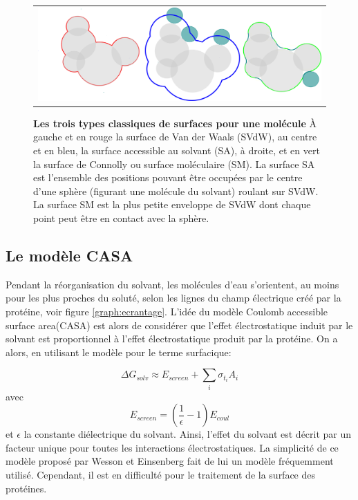    \begin{figure}[!htbp]
     \centering
     \begin{tabular}{c}
       \includegraphics[width=13cm]{figure/surface.png} &
     \end{tabular}
     
     \caption{\textbf{Les trois types classiques de surfaces pour une molécule} À gauche et en rouge la surface de Van der Waals (SVdW), au centre et en bleu, la surface accessible au solvant (SA), à droite, et en vert  la surface de Connolly ou surface moléculaire (SM). La surface SA est l'ensemble des positions pouvant être occupées par le centre d'une sphère (figurant une molécule du solvant) roulant sur SVdW. La surface SM est la plus petite enveloppe de SVdW dont chaque point peut être en contact avec la sphère. } 
\label{graph:surface}
   \end{figure}
   

\subsection{Le modèle CASA}
\label{sub:CASA}
Pendant la réorganisation du solvant, les molécules d'eau s'orientent, au moins pour les plus proches du soluté, selon les lignes du champ électrique créé par la protéine, voir figure \ref{graph:ecrantage}. L'idée du modèle \og Coulomb accessible surface area\fg (CASA) est alors de considérer que l'effet électrostatique induit par le solvant est proportionnel à l'effet électrostatique produit par la protéine. On a  alors, en utilisant le modèle  pour le terme surfacique:

\begin{equation}
\Delta G_{solv} \approx E_{screen} + \sum_i \sigma_{t_i} A_i
\end{equation}
avec 
\begin{equation}
E_{screen} =  (\frac{1}{\epsilon} -1 )E_{coul}
\end{equation}
et $ \epsilon $ la constante diélectrique du solvant. Ainsi, l'effet du solvant est décrit par un facteur unique pour toutes les interactions électrostatiques. La simplicité de ce modèle proposé par Wesson et Einsenberg \cite{Wesson92} fait de lui un modèle fréquemment utilisé. Cependant, il est en difficulté pour le traitement de la surface des protéines.


